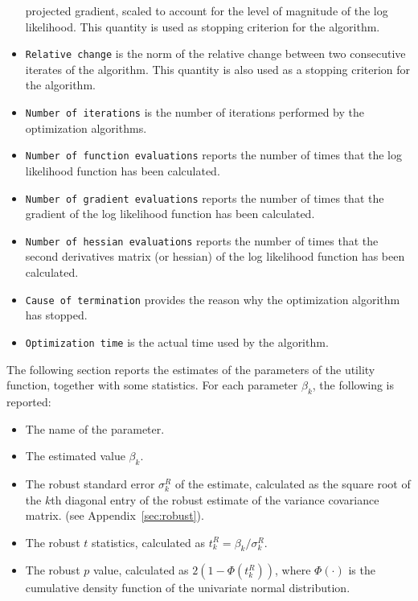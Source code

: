 \documentclass[12pt,a4paper]{article}
\begin{document}
\begin{itemize}
           projected gradient, scaled to account for the level of
           magnitude of the log likelihood. This quantity is used as
           stopping criterion for the algorithm.
         \item \texttt{Relative change} is the norm of the relative change between two consecutive iterates of the algorithm. This quantity is also used as a stopping criterion for the algorithm.
         \item \texttt{Number of iterations} is the number of
           iterations performed by the optimization algorithms.
         \item \texttt{Number of function evaluations} reports the
           number of times that the log likelihood function has been
           calculated.
         \item \texttt{Number of gradient evaluations} reports the
           number of times that the gradient of the log likelihood function has been
           calculated.
         \item \texttt{Number of hessian evaluations} reports the
           number of times that the second derivatives matrix (or
           hessian) of the log likelihood function has been
           calculated.
         \item \texttt{Cause of termination} provides the reason why
           the optimization algorithm has stopped. 
         \item \texttt{Optimization time} is the actual time used by the algorithm.
   \end{itemize}


The following section reports the estimates of the parameters of the
utility function,
together with some statistics. For each parameter $\beta_k$, the following is reported:
   \begin{itemize}
  \item The name of the parameter.
      \item The estimated value $\beta_k$. 
      \item The robust standard error $\sigma^R_k$ of the estimate, calculated as the
         square root of the $k$th diagonal entry of the
         robust estimate of the variance covariance matrix. (see Appendix~\ref{sec:robust}).
     \item The robust $t$ statistics, calculated as $t^R_k=\beta_k/\sigma^R_k$.
     \item The robust $p$ value, calculated as $2 (1 - \Phi(t^R_k))$,
where $\Phi(\cdot)$ is the cumulative density function of the
univariate normal distribution. 
   \end{itemize}
\end{document}
